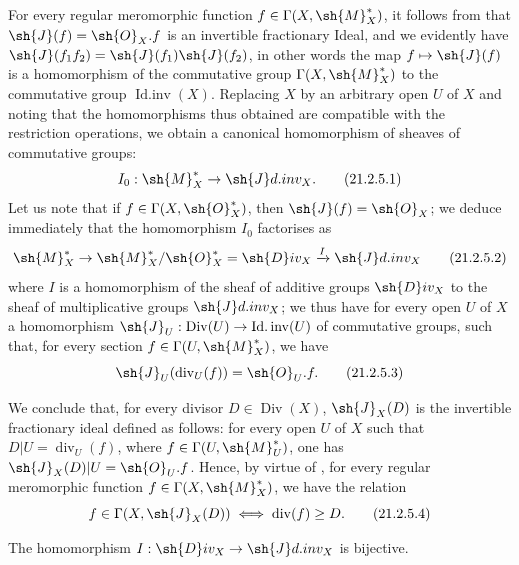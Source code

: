 \begin{env}[21.2.5]
\label{IV.21.2.5}
For every regular meromorphic function $f\in\Gamma(X,\sh{M}_X^*)$, it follows from  that $\sh{J}(f)=\sh{O}_X.f$ is an invertible fractionary Ideal, and we evidently have $\sh{J}(f_1f_2)=\sh{J}(f_1)\sh{J}(f_2)$, in other words the map $f\mapsto\sh{J}(f)$ is a homomorphism of the commutative group $\Gamma(X,\sh{M}_X^*)$ to the commutative group $\operatorname{Id.inv}(X)$.
Replacing $X$ by an arbitrary open $U$ of $X$ and noting that the homomorphisms thus obtained are compatible with the restriction operations, we obtain a canonical homomorphism of sheaves of commutative groups:
\[
\label{IV.21.2.5.1}
  I_0:\sh{M}_X^*\to\sh{J}d.inv_X.
  \tag{21.2.5.1}
\]
Let us note that if $f\in\Gamma(X,\sh{O}_X^*)$, then $\sh{J}(f)=\sh{O}_X$;
we deduce immediately that the homomorphism $I_0$ factorises as
\[
\label{IV.21.2.5.2}
  \sh{M}_X^*\to\sh{M}_X^*/\sh{O}_X^*=\sh{D}iv_X\xrightarrow{I}\sh{J}d.inv_X
  \tag{21.2.5.2}
\]
where $I$ is a homomorphism of the sheaf of additive groups $\sh{D}iv_X$ to the sheaf of multiplicative groups $\sh{J}d.inv_X$;
we thus have for every open $U$ of $X$ a homomorphism $\sh{J}_U:\operatorname{Div}(U)\to\operatorname{Id.inv}(U)$ of commutative groups, such that, for every section $f\in\Gamma(U,\sh{M}_X^*)$, we have
\[
\label{IV.21.2.5.3}
  \sh{J}_U(\operatorname{div}_U(f))=\sh{O}_U.f.
  \tag{21.2.5.3}
\]

We conclude that, for every divisor $D\in\operatorname{Div}(X)$, $\sh{J}_X(D)$ is the invertible fractionary ideal defined as follows:
for every open $U$ of $X$ such that $D|U=\operatorname{div}_U(f)$, where $f\in\Gamma(U,\sh{M}_U^*)$, one has $\sh{J}_X(D)|U=\sh{O}_U.f$.
Hence, by virtue of , for every regular meromorphic function $f\in\Gamma(X,\sh{M}_X^*)$, we have the relation
\[
\label{IV.21.2.5.4}
  f\in\Gamma(X,\sh{J}_X(D)) \iff \operatorname{div}(f)\geq D.
  \tag{21.2.5.4}
\]
\end{env}

\begin{proposition}[21.2.6]
\label{IV.21.2.6}
The homomorphism $I:\sh{D}iv_X\to\sh{J}d.inv_X$ is bijective.
\end{proposition}

